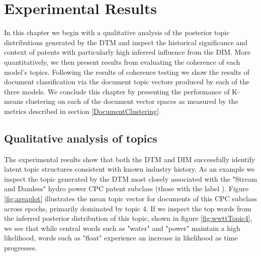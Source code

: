 
\chapter{Experimental Results} %

\label{Chapter4} %
In this chapter we begin with a qualitative analysis of the posterior topic distributions generated by the DTM and inspect the historical significance and context of patents with particularly high inferred influence from the DIM. More quantitatively, we then present results from evaluating the coherence of each model's topics. Following the results of coherence testing we show the results of document classification via the document topic vectors produced by each of the three models. We conclude this chapter by presenting the performance of K-means clustering on each of the document vector spaces as measured by the metrics described in section \ref{DocumentClustering}.


\section{Qualitative analysis of topics}
%

The experimental results show that both the DTM and DIM successfully identify latent topic structures consistent with known industry history. As an example we inspect the topic generated by the DTM most closely associated with the "Stream and Damless" hydro power CPC patent subclass (those with the label ). Figure \ref{fig:areaplot} illustrates the mean topic vector for documents of this CPC subclass across epochs, primarily dominated by topic 4. If we inspect the top words from the inferred posterior distribution of this topic, shown in figure \ref{fig:wwttTopic4}, we see that while central words such as "water" and "power" maintain a high likelihood, words such as "float" experience an increase in likelihood as time progresses. 


